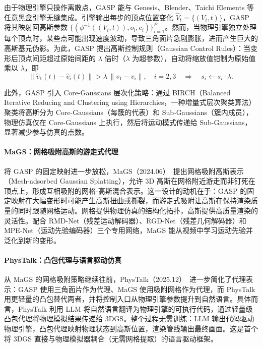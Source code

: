 由于物理引擎只操作离散点，GASP 能与 Genesis、Blender、Taichi Elements 等任意黑盒引擎无缝集成。引擎输出每步的顶点位置变化 $\hat{V}_t = \{(V_i, t)\}$，GASP 将其映射回高斯参数 $\{(\phi^{-1}((V_i, t)), o_i, c_i)\}_{i=1}^P$。然而，当物理引擎独立处理每个顶点时，某些点可能出现速度波动，导致三角面片急剧膨胀，进而产生巨大的高斯基元伪影。为此，GASP 提出高斯控制规则（Gaussian Control Rules）：当变形后顶点间距超过原始间距的 $\lambda$ 倍时（$\lambda$ 为超参数），自动将缩放值钳制为原始值乘以 $\lambda$，即
\begin{equation}
\| \hat{v}_1(t) - \hat{v}_i(t) \| > \lambda \, \| v_1 - v_i \|, \quad i = 2, 3 \quad \Rightarrow \quad s_i \leftarrow s_i \cdot \lambda.
\end{equation}

此外，GASP 引入 Core-Gaussians 层次化策略：通过 BIRCH（Balanced Iterative Reducing and Clustering using Hierarchies，一种增量式层次聚类算法）聚类将高斯分为 Core-Gaussians（每簇的代表）和 Sub-Gaussians（簇内成员），物理仿真仅在 Core-Gaussians 上执行，然后将运动模式传递给 Sub-Gaussians，显著减少参与仿真的点数。

\paragraph{MaGS：网格吸附高斯的游走式代理}

将 GASP 的固定映射进一步放松，MaGS（2024.06）~\cite{2406_01593}提出网格吸附高斯表示（Mesh-adsorbed Gaussian Splatting），允许 3D 高斯在网格附近游走而非钉死在顶点上，形成互相吸附的网格-高斯混合表示。这一设计的动机在于：GASP 的固定映射在大幅变形时可能产生高斯扭曲或撕裂，而游走式吸附让高斯在保持渲染质量的同时跟随网格运动。网格提供物理仿真的结构化拓扑，高斯提供高质量渲染的灵活性。配合 RMD-Net（残差运动解码器）、RGD-Net（残差几何解码器）和 MPE-Net（运动先验编码器）三个专用网络，MaGS 能从视频中学习运动先验并泛化到新的变形。

\paragraph{PhysTalk：凸包代理与语言驱动仿真}

从 MaGS 的网格吸附策略继续往前，PhysTalk（2025.12）~\cite{2512_24986}进一步简化了代理表示：GASP 使用三角面片作为代理、MaGS 使用吸附网格作为代理，而 PhysTalk 用更轻量的凸包替代两者，并将控制入口从物理引擎参数提升到自然语言。具体而言，PhysTalk 利用 LLM 将自然语言翻译为物理引擎的可执行代码，通过轻量级凸包代理将物理模拟结果传递给 3DGS。整个过程无需训练：LLM 输出代码驱动物理引擎，凸包代理映射物理状态到高斯位置，渲染管线输出最终画面。这是首个将 3DGS 直接与物理模拟器耦合（无需网格提取）的语言驱动框架。

